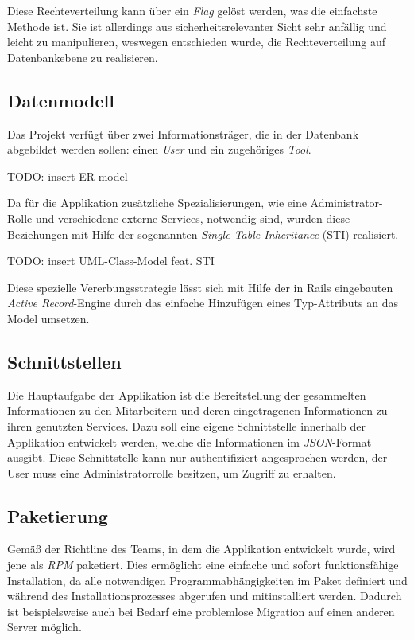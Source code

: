 Diese Rechteverteilung kann über ein \textit{Flag} gelöst werden, was die einfachste Methode ist.
Sie ist allerdings aus sicherheitsrelevanter Sicht sehr anfällig und leicht zu manipulieren,
weswegen entschieden wurde, die Rechteverteilung auf Datenbankebene zu realisieren.

\subsection{Datenmodell}
\label{sec:Datenmodell}
Das Projekt verfügt über zwei Informationsträger, die in der Datenbank abgebildet werden
sollen: einen \textit{User} und ein zugehöriges \textit{Tool}.

TODO: insert ER-model

Da für die Applikation zusätzliche Spezialisierungen, wie eine Administrator-Rolle und verschiedene
externe Services, notwendig sind, wurden diese Beziehungen mit Hilfe der sogenannten
\textit{Single Table Inheritance} (\acs{STI}) realisiert.

TODO: insert UML-Class-Model feat. STI

Diese spezielle Vererbungsstrategie lässt sich mit Hilfe der in Rails eingebauten
\textit{Active Record}-Engine durch das einfache Hinzufügen eines Typ-Attributs an das Model
umsetzen.

\subsection{Schnittstellen}
\label{sec:Schnittstellen}
Die Hauptaufgabe der Applikation ist die Bereitstellung der gesammelten Informationen zu den
Mitarbeitern und deren eingetragenen Informationen zu ihren genutzten Services. Dazu soll eine
eigene Schnittstelle innerhalb der Applikation entwickelt werden, welche die Informationen im
\textit{JSON}-Format ausgibt. Diese Schnittstelle kann nur authentifiziert angesprochen werden,
\dahe der User muss eine Administratorrolle besitzen, um Zugriff zu erhalten.

\subsection{Paketierung}
\label{sec:Paketierung}
Gemäß der Richtline des Teams, in dem die Applikation entwickelt wurde, wird jene als \textit{RPM}
paketiert. Dies ermöglicht eine einfache und sofort funktionsfähige Installation, da alle
notwendigen Programmabhängigkeiten im Paket definiert und während des Installationsprozesses
abgerufen und mitinstalliert werden. Dadurch ist beispielsweise auch bei Bedarf eine problemlose
Migration auf einen anderen Server möglich.
